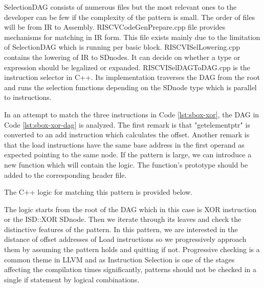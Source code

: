 SelectionDAG consists of numerous files but the most relevant ones to the developer can be few if the complexity of the pattern is small. The order of files will be from IR to Assembly. RISCVCodeGenPrepare.cpp file provides mechanisms for matching in IR form. This file exists mainly due to the limitation of SelectionDAG which is running per basic block. RISCVISelLowering.cpp contains the lowering of IR to SDnodes. It can decide on whether a type or expression should be legalized or expanded. RISCVISelDAGToDAG.cpp is the instruction selector in C++. Its implementation traverses the DAG from the root and runs the selection functions depending on the SDnode type which is parallel to instructions. 




In an attempt to match the three instructions in Code \ref{lst:sbox-xor}, the DAG in Code \ref{lst:sbox-xor-dag} is analyzed. The first remark is that "getelementptr" is converted to an add instruction which calculates the offset. Another remark is that the load instructions have the same base address in the first operand as expected pointing to the same node. If the pattern is large, we can introduce a new function which will contain the logic. The function's prototype should be added to the corresponding header file.





The C++ logic for matching this pattern is provided below.



The logic starts from the root of the DAG which in this case is XOR instruction or the ISD::XOR SDnode. Then we iterate through its leaves and check the distinctive features of the pattern. In this pattern, we are interested in the distance of offset addresses of Load instructions so we progressively approach them by assuming the pattern holds and quitting if not. Progressive checking is a common theme in LLVM and as Instruction Selection is one of the stages affecting the compilation times significantly, patterns should not be checked in a single if statement by logical combinations. 

